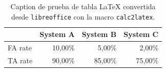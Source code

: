 %

\begin{table}[htbp]
\caption{Caption de prueba de tabla LaTeX convertida desde
  \texttt{libreoffice} con la macro \texttt{calc2latex}.}
\begin{center}
\begin{tabular}{|l|r|r|r|}
\hline
 & \multicolumn{1}{l|}{System A} & \multicolumn{1}{l|}{System B} & \multicolumn{1}{l|}{System C} \\ \hline
FA rate & 10,00\% & 5,00\% & 2,00\% \\ \hline
TA rate & 90,00\% & 85,00\% & 75,00\% \\ \hline
\end{tabular}
\end{center}
\label{pruebaCalc2LaTeX}
\end{table}

